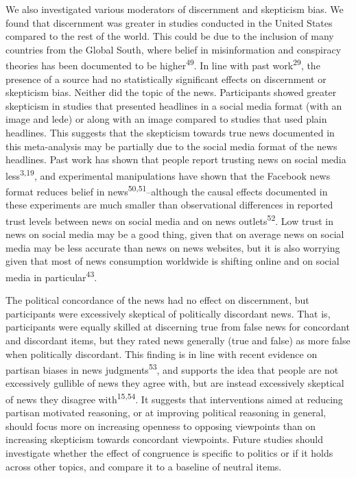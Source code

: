 \documentclass[
  man]{apa6}
\begin{document}
We also investigated various moderators of discernment and skepticism bias. We found that discernment was greater in studies conducted in the United States compared to the rest of the world. This could be due to the inclusion of many countries from the Global South, where belief in misinformation and conspiracy theories has been documented to be higher\textsuperscript{49}. In line with past work\textsuperscript{29}, the presence of a source had no statistically significant effects on discernment or skepticism bias. Neither did the topic of the news. Participants showed greater skepticism in studies that presented headlines in a social media format (with an image and lede) or along with an image compared to studies that used plain headlines. This suggests that the skepticism towards true news documented in this meta-analysis may be partially due to the social media format of the news headlines. Past work has shown that people report trusting news on social media less\textsuperscript{3,19}, and experimental manipulations have shown that the Facebook news format reduces belief in news\textsuperscript{50,51}--although the causal effects documented in these experiments are much smaller than observational differences in reported trust levels between news on social media and on news outlets\textsuperscript{52}. Low trust in news on social media may be a good thing, given that on average news on social media may be less accurate than news on news websites, but it is also worrying given that most of news consumption worldwide is shifting online and on social media in particular\textsuperscript{43}.

The political concordance of the news had no effect on discernment, but participants were excessively skeptical of politically discordant news. That is, participants were equally skilled at discerning true from false news for concordant and discordant items, but they rated news generally (true and false) as more false when politically discordant. This finding is in line with recent evidence on partisan biases in news judgments\textsuperscript{53}, and supports the idea that people are not excessively gullible of news they agree with, but are instead excessively skeptical of news they disagree with\textsuperscript{15,54}. It suggests that interventions aimed at reducing partisan motivated reasoning, or at improving political reasoning in general, should focus more on increasing openness to opposing viewpoints than on increasing skepticism towards concordant viewpoints. Future studies should investigate whether the effect of congruence is specific to politics or if it holds across other topics, and compare it to a baseline of neutral items.
\end{document}
